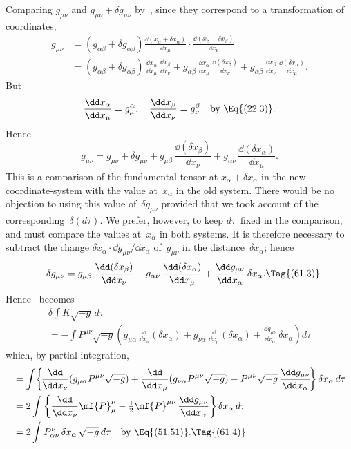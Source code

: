 \documentclass[12pt]{book}
\begin{document}
Comparing $g_{\mu\nu}$ and $g_{\mu\nu} + \delta g_{\mu\nu}$ by~, since they correspond to a transformation
of coordinates,
\begin{align*}
  g_{\mu\nu} &= (g_{\alpha\beta} + \delta g_{\alpha\beta})
        \frac{\dd(x_{\alpha} + \delta x_{\alpha})}{\dd x_{\mu}}
  \cdot \frac{\dd(x_{\beta} + \delta x_{\beta})}{\dd x_{\nu}} \\
  &= (g_{\alpha\beta} + \delta g_{\alpha\beta})\,
  \frac{\dd x_{\alpha}}{\dd x_{\mu}}\, \frac{\dd x_{\beta}}{\dd x_{\nu}}
  + g_{\alpha\beta}\,
  \frac{\dd x_{\alpha}}{\dd x_{\mu}}\, \frac{\dd (\delta x_{\beta})}{\dd x_{\nu}}
  + g_{\alpha\beta}\,
  \frac{\dd x_{\beta}}{\dd x_{\nu}}\, \frac{\dd (\delta x_{\alpha})}{\dd x_{\mu}}.
\end{align*}
But
\[
\frac{\dd x_{\alpha}}{\dd x_{\mu}} = g_{\mu}^{\alpha},\quad
\frac{\dd x_{\beta}}{\dd x_{\nu}} = g_{\nu}^{\beta}\quad\text{by~\Eq{(22.3)}.}
\]
Hence
\[
g_{\mu\nu} = g_{\mu\nu} + \delta g_{\mu\nu}
+ g_{\mu\beta}\, \frac{\dd(\delta x_{\beta})}{\dd x_{\nu}}
+ g_{\alpha\nu}\, \frac{\dd(\delta x_{\alpha})}{\dd x_{\mu}}.
\]
This is a comparison of the fundamental tensor at $x_{\alpha} + \delta x_{\alpha}$ in the new
coordinate-system with the value at~$x_{\alpha}$ in the old system. There would be no
objection to using this value of~$\delta g_{\mu\nu}$ provided that we took account of the
corresponding~$\delta(d\tau)$. We prefer, however, to keep $d\tau$~fixed in the comparison,
and must compare the values at~$x_{\alpha}$ in both systems. It is therefore necessary
to subtract the change $\delta x_{\alpha} \cdot \dd g_{\mu\nu}/\dd x_{\alpha}$ of~$g_{\mu\nu}$ in the distance~$\delta x_{\alpha}$; hence
\[
-\delta g_{\mu\nu}
= g_{\mu\beta}\, \frac{\dd(\delta x_{\beta})}{\dd x_{\nu}}
+ g_{\alpha\nu}\, \frac{\dd(\delta x_{\alpha})}{\dd x_{\mu}}
+ \frac{\dd g_{\mu\nu}}{\dd x_{\alpha}}\, \delta x_{\alpha}.
\Tag{(61.3)}
\]
Hence ~becomes
\begin{multline*}
\delta \int K \sqrt{-g}\, d\tau \\
= -\int P^{\mu\nu} \sqrt{-g} \left(
g_{\mu\alpha}\, \frac{\dd}{\dd x_{\nu}} (\delta x_{\alpha})
+ g_{\nu\alpha}\, \frac{\dd}{\dd x_{\mu}} (\delta x_{\alpha})
+ \frac{\dd g_{\mu\nu}}{\dd x_{\alpha}}\, \delta x_{\alpha}
\right) d\tau
\end{multline*}
which, by partial integration,
\begin{align*}
  &= \int\! \left\{\!\frac{\dd}{\dd x_{\nu}} (g_{\mu\alpha} P^{\mu\nu} \sqrt{-g})
  + \frac{\dd}{\dd x_{\mu}} (g_{\nu\alpha} P^{\mu\nu} \sqrt{-g})
  - P^{\mu\nu} \sqrt{-g}\, \frac{\dd g_{\mu\nu}}{\dd x_{\alpha}}\!\right\} \delta x_{\alpha}\, d\tau \\
  &= 2\int \left\{\frac{\dd}{\dd x_{\nu}} \mf{P}_{\mu}^{\nu}
  - \tfrac{1}{2} \mf{P}^{\mu\nu}\, \frac{\dd g_{\mu\nu}}{\dd x_{\alpha}}\right\} \delta x_{\alpha}\, d\tau \\
  &= 2\int P_{\alpha\nu}^{\nu}\, \delta x_{\alpha}\, \sqrt{-g}\, d\tau
  \quad\text{by~\Eq{(51.51)}.}
  \Tag{(61.4)}
\end{align*}
\end{document}
